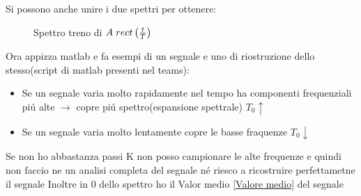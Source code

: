                 Si possono anche unire i due spettri per ottenere: 
                \begin{figure}[H]
                    \centering
                    \caption{Spettro treno di $A\hspace{0.1cm}rect\left(\frac{t}{T}\right)$}
                    \label{fig:Spettro treno di rect}
                \end{figure}  
            Ora appizza matlab e fa esempi di un segnale e uno di riostruzione dello stesso(script di matlab presenti nel teams):
            \begin{itemize}
                \item Se un segnale varia molto rapidamente nel tempo ha componenti frequenziali piú alte $\rightarrow$ copre piú spettro(espansione spettrale) $T_0 \uparrow$
                \item Se un segnale varia molto lentamente copre le basse fraquenze $ T_0 \downarrow$
            \end{itemize}
            Se non ho abbastanza passi K non posso campionare le alte frequenze e quindi non faccio ne un analisi completa del segnale né riesco a ricostruire perfettametne il segnale  
            Inoltre in $0$ dello spettro ho il Valor medio \ref{Valore medio} del segnale